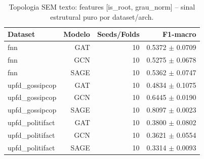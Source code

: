 \begin{table}[h]\centering
\caption{Topologia SEM texto: features [is\_root, grau\_norm] -- sinal estrutural puro por dataset/arch.}
\label{tab:topologia_sem_texto}
\begin{tabular}{lrrr}
\toprule
Dataset & Modelo & Seeds/Folds & F1-macro \\
\midrule
fnn & GAT & 10 & 0.5372 $\pm$ 0.0709 \\
fnn & GCN & 10 & 0.5275 $\pm$ 0.0678 \\
fnn & SAGE & 10 & 0.5362 $\pm$ 0.0747 \\
upfd_gossipcop & GAT & 10 & 0.4834 $\pm$ 0.1075 \\
upfd_gossipcop & GCN & 10 & 0.6445 $\pm$ 0.0190 \\
upfd_gossipcop & SAGE & 10 & 0.8097 $\pm$ 0.0023 \\
upfd_politifact & GAT & 10 & 0.3800 $\pm$ 0.0802 \\
upfd_politifact & GCN & 10 & 0.3621 $\pm$ 0.0554 \\
upfd_politifact & SAGE & 10 & 0.3314 $\pm$ 0.0093 \\
\bottomrule
\end{tabular}
\end{table}